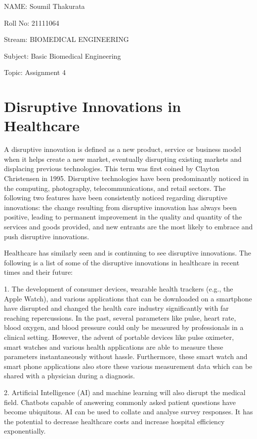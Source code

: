 \documentclass[11pt]{article}
\begin{document}
NAME: Soumil Thakurata

Roll No: 21111064

Stream: BIOMEDICAL ENGINEERING

Subject: Basic Biomedical Engineering

Topic: Assignment 4

\pagebreak


\section*{\centering Disruptive Innovations in Healthcare}

A disruptive innovation is defined as a new product, service or business model when it helps create a new market, eventually disrupting existing markets and displacing previous technologies. This term was first coined by Clayton Christensen in 1995. Disruptive technologies have been predominantly noticed in the computing, photography, telecommunications, and retail sectors. The following two features have been consistently noticed regarding disruptive innovations: the change resulting from disruptive innovation has always been positive, leading to permanent improvement in the quality and quantity of the services and goods provided, and new entrants are the most likely to embrace and push disruptive innovations.

Healthcare has similarly seen and is continuing to see disruptive innovations. The following is a list of some of the disruptive innovations in healthcare in recent times and their future:

1. The development of consumer devices, wearable health trackers (e.g., the Apple Watch), and various applications that can be downloaded on a smartphone have disrupted and changed the health care industry significantly with far reaching repercussions. In the past, several parameters like pulse, heart rate, blood oxygen, and blood pressure could only be measured by professionals in a clinical setting. However, the advent of portable devices like pulse oximeter, smart watches and various health applications are able to measure these parameters instantaneously without hassle. Furthermore, these smart watch and smart phone applications also store these various measurement data which can be shared with a physician during a diagnosis.

2.  Artificial Intelligence (AI) and machine learning will also disrupt the medical field. Chatbots capable of answering commonly asked patient questions have become ubiquitous. AI can be used to collate and analyse survey responses. It has the potential to decrease healthcare costs and increase hospital efficiency exponentially.
\end{document}
